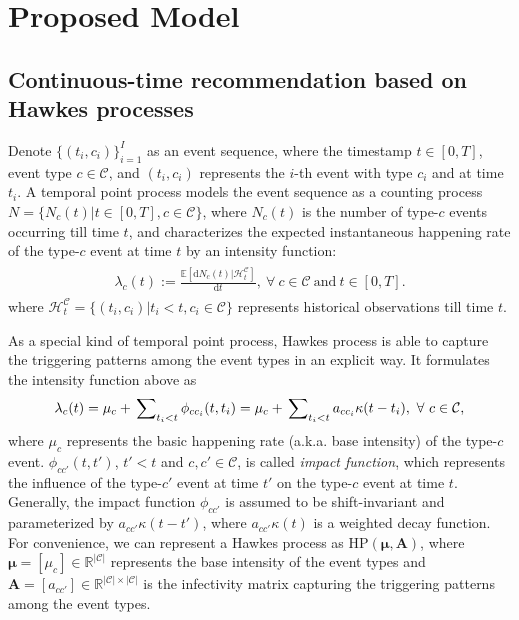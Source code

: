 \documentclass[runningheads]{llncs}
\newcommand{\dd}{\mathrm{d}}
\begin{document}
\section{Proposed Model}
\subsection{Continuous-time recommendation based on Hawkes processes}

Denote $\{(t_i, c_i)\}_{i=1}^{I}$ as an event sequence, where the timestamp $t \in [0, T]$, event type $c\in\mathcal{C}$, and $(t_i, c_i)$ represents the $i$-th event with type $c_i$ and at time $t_i$. 
A temporal point process models the event sequence as a counting process $N = \{ N_c(t) | t \in [0, T], c\in\mathcal{C} \}$, where $N_c(t)$ is the number of type-$c$ events occurring till time $t$, and characterizes the expected instantaneous happening rate of the type-$c$ event at time $t$ by an intensity function: 
\begin{eqnarray}\label{eq:intensity}
\begin{aligned}
\lambda_c(t) := \frac{\mathbb{E}[\dd N_c(t)|\mathcal{H}_t^\mathcal{C}]}{\dd t},~\forall~c\in\mathcal{C}~\text{and}~t\in [0, T].
\end{aligned}    
\end{eqnarray}
where $\mathcal{H}_t^\mathcal{C}=\{(t_i, c_i)| t_i < t, c_i \in \mathcal{C}\}$ represents historical observations till time $t$.

As a special kind of temporal point process, Hawkes process is able to capture the triggering patterns among the event types in an explicit way. 
It formulates the intensity function above as
\begin{eqnarray}\label{eq:hp}
\begin{aligned}
\lambda_c(t) = \mu_c + \sideset{}{_{t_i < t}}\sum \phi_{cc_i} (t, t_i) = \mu_c + \sideset{}{_{t_i < t}}\sum a_{cc_i}\kappa(t- t_i),~\forall~c\in\mathcal{C},
\end{aligned}    
\end{eqnarray}
where $\mu_c$ represents the basic happening rate (a.k.a. base intensity) of the type-$c$ event. 
$\phi_{cc'} (t, t')$, $t'<t$ and $c,c'\in\mathcal{C}$, is called \textit{impact function}, which represents the influence of the type-$c'$ event at time $t'$ on the type-$c$ event at time $t$. 
Generally, the impact function $\phi_{cc'}$ is assumed to be shift-invariant and parameterized by $a_{cc'}\kappa(t -t')$, where $a_{cc'}\kappa(t)$ is a weighted decay function. 
For convenience, we can represent a Hawkes process as $\text{HP}(\bm{\mu},\bm{A})$, where $\bm{\mu}=[\mu_c]\in\mathbb{R}^{|\mathcal{C}|}$ represents the base intensity of the event types and $\bm{A}=[a_{cc'}]\in\mathbb{R}^{|\mathcal{C}|\times |\mathcal{C}|}$ is the infectivity matrix capturing the triggering patterns among the event types.
\end{document}
